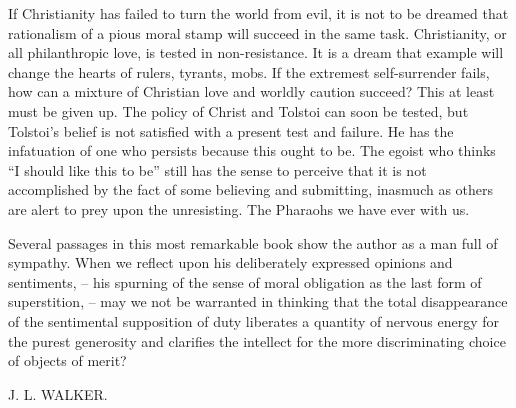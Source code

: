 If Christianity has failed to turn the world from evil, it is not to be 
dreamed that rationalism of a pious moral stamp will succeed in the same task. 
Christianity, or all philanthropic love, is tested in non-resistance. It is a 
dream that example will change the hearts of rulers, tyrants, mobs. If the 
extremest self-surrender fails, how can a mixture of Christian love and 
worldly caution succeed? This at least must be given up. The policy of Christ 
and Tolstoi can soon be tested, but Tolstoi's belief is not satisfied with a 
present test and failure. He has the infatuation of one who persists because 
this ought to be. The egoist who thinks ``I should like this to be'' still 
has the sense to perceive that it is not accomplished by the fact of some 
believing and submitting, inasmuch as others are alert to prey upon the 
unresisting. The Pharaohs we have ever with us.

Several passages in this most remarkable book show the author as a man full of 
sympathy. When we reflect upon his deliberately expressed opinions and 
sentiments, -- his spurning of the sense of moral obligation as the last form 
of superstition, -- may we not be warranted in thinking that the total 
disappearance of the sentimental supposition of duty liberates a quantity of 
nervous energy for the purest generosity and clarifies the intellect for the 
more discriminating choice of objects of merit?

\begin{flushright}
J. L. WALKER.\end{flushright}
